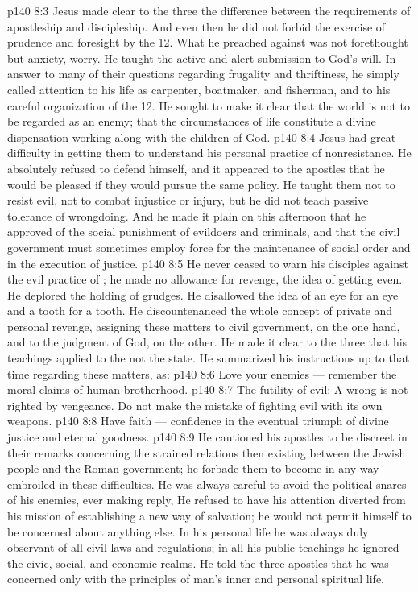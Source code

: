 \vs p140 8:3 Jesus made clear to the three the difference between the requirements of apostleship and discipleship. And even then he did not forbid the exercise of prudence and foresight by the 12. What he preached against was not forethought but anxiety, worry. He taught the active and alert submission to God’s will. In answer to many of their questions regarding frugality and thriftiness, he simply called attention to his life as carpenter, boatmaker, and fisherman, and to his careful organization of the 12. He sought to make it clear that the world is not to be regarded as an enemy; that the circumstances of life constitute a divine dispensation working along with the children of God.
\vs p140 8:4 Jesus had great difficulty in getting them to understand his personal practice of nonresistance. He absolutely refused to defend himself, and it appeared to the apostles that he would be pleased if they would pursue the same policy. He taught them not to resist evil, not to combat injustice or injury, but he did not teach passive tolerance of wrongdoing. And he made it plain on this afternoon that he approved of the social punishment of evildoers and criminals, and that the civil government must sometimes employ force for the maintenance of social order and in the execution of justice.
\vs p140 8:5 He never ceased to warn his disciples against the evil practice of ; he made no allowance for revenge, the idea of getting even. He deplored the holding of grudges. He disallowed the idea of an eye for an eye and a tooth for a tooth. He discountenanced the whole concept of private and personal revenge, assigning these matters to civil government, on the one hand, and to the judgment of God, on the other. He made it clear to the three that his teachings applied to the  not the state. He summarized his instructions up to that time regarding these matters, as:
\vs p140 8:6 Love your enemies --- remember the moral claims of human brotherhood.
\vs p140 8:7 The futility of evil: A wrong is not righted by vengeance. Do not make the mistake of fighting evil with its own weapons.
\vs p140 8:8 Have faith --- confidence in the eventual triumph of divine justice and eternal goodness.
\vs p140 8:9 \bibnobreakspace {} He cautioned his apostles to be discreet in their remarks concerning the strained relations then existing between the Jewish people and the Roman government; he forbade them to become in any way embroiled in these difficulties. He was always careful to avoid the political snares of his enemies, ever making reply,  He refused to have his attention diverted from his mission of establishing a new way of salvation; he would not permit himself to be concerned about anything else. In his personal life he was always duly observant of all civil laws and regulations; in all his public teachings he ignored the civic, social, and economic realms. He told the three apostles that he was concerned only with the principles of man’s inner and personal spiritual life.
